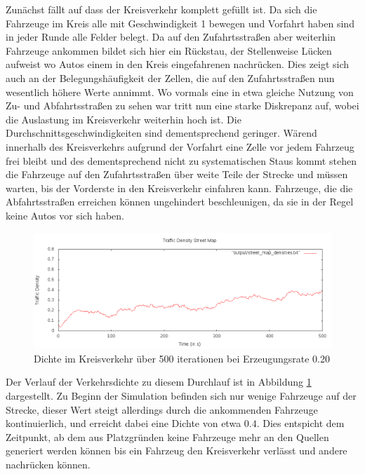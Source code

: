 \documentclass[11pt, a4paper]{article}
\begin{document}
Zunächst fällt auf dass der Kreisverkehr komplett gefüllt ist. Da sich die Fahrzeuge im Kreis alle mit Geschwindigkeit 1 bewegen und Vorfahrt haben sind in jeder Runde alle Felder belegt. Da auf den Zufahrtsstraßen aber weiterhin Fahrzeuge ankommen bildet sich hier ein Rückstau, der Stellenweise Lücken aufweist wo Autos einem in den Kreis eingefahrenen nachrücken. Dies zeigt sich auch an der Belegungshäufigkeit der Zellen, die auf den Zufahrtsstraßen nun wesentlich höhere Werte annimmt. Wo vormals eine in etwa gleiche Nutzung von Zu- und Abfahrtsstraßen zu sehen war tritt nun eine starke Diskrepanz auf, wobei die Auslastung im Kreisverkehr weiterhin hoch ist. Die Durchschnittsgeschwindigkeiten sind dementsprechend geringer. Wärend innerhalb des Kreisverkehrs aufgrund der Vorfahrt eine Zelle vor jedem Fahrzeug frei bleibt und des dementsprechend nicht zu systematischen Staus kommt stehen die Fahrzeuge auf den Zufahrtsstraßen über weite Teile der Strecke und müssen warten, bis der Vorderste in den Kreisverkehr einfahren kann. Fahrzeuge, die die Abfahrtsstraßen erreichen können ungehindert beschleunigen, da sie in der Regel keine Autos vor sich haben.

\begin{figure}[h!]
	\centering
	\includegraphics[width=\textwidth]{img/roundabout_020_densities}
	\caption{Dichte im Kreisverkehr über 500 iterationen bei Erzeugungsrate 0.20}
	\label{fig:roundabout020density}
\end{figure}

Der Verlauf der Verkehrsdichte zu diesem Durchlauf ist in Abbildung \ref{fig:roundabout020density} dargestellt. Zu Beginn der Simulation befinden sich nur wenige Fahrzeuge auf der Strecke, dieser Wert steigt allerdings durch die ankommenden Fahrzeuge kontinuierlich, und erreicht dabei eine Dichte von etwa $0.4$. Dies entspicht dem Zeitpunkt, ab dem aus Platzgründen keine Fahrzeuge mehr an den Quellen generiert werden können bis ein Fahrzeug den Kreisverkehr verlässt und andere nachrücken können.
\end{document}
